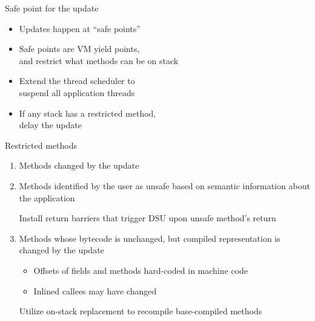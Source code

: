 \begin{frame}[t,label=suspend]{Safe point for the update}
\begin{itemize}
\item Updates happen at ``safe points''
\item Safe points are VM yield points, \\
      and restrict what methods can be on stack
\item<3> Extend the thread scheduler to \\
      suspend all application threads
\item<3> If any stack has a restricted method, \\
      delay the update
\end{itemize}%
\end{frame}

\begin{frame}[t,fragile]{Restricted methods}%
\begin{enumerate}[(1)]
\item Methods changed by the update
\item Methods identified by the user as unsafe based on semantic
information about the application
\begin{block}{}
Install return barriers that trigger DSU upon unsafe method's return
\end{block}
\vspace{2ex}
\item<2> Methods whose bytecode is unchanged, but compiled representation is
      changed by the update
  \begin{itemize}
  \item Offsets of fields and methods hard-coded in machine code
  \item Inlined callees may have changed
  \end{itemize}
\begin{block}{}
Utilize on-stack replacement to recompile base-compiled methods
\end{block}
\end{enumerate}
\end{frame}

% 
% 

